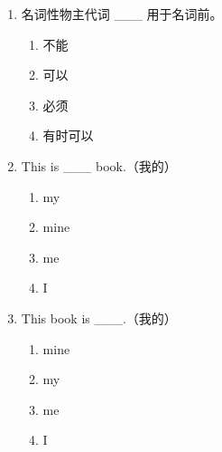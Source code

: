 \documentclass[11pt,a4paper]{ctexart}
\begin{document}
\begin{enumerate}[leftmargin=*,itemsep=4pt]
\item 名词性物主代词 \_\_\_ 用于名词前。
\begin{enumerate}[label=\Alph*.,leftmargin=2em,itemsep=1pt,topsep=2pt]
\item 不能
\item 可以
\item 必须
\item 有时可以
\end{enumerate}
\item This is \_\_\_ book.（我的）
\begin{enumerate}[label=\Alph*.,leftmargin=2em,itemsep=1pt,topsep=2pt]
\item my
\item mine
\item me
\item I
\end{enumerate}
\item This book is \_\_\_.（我的）
\begin{enumerate}[label=\Alph*.,leftmargin=2em,itemsep=1pt,topsep=2pt]
\item mine
\item my
\item me
\item I
\end{enumerate}
\end{enumerate}
\end{document}
